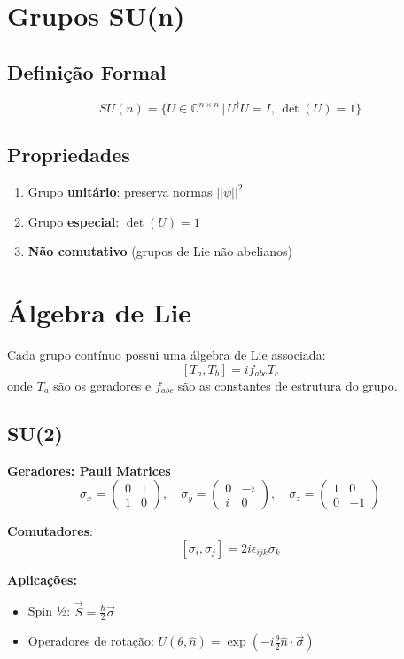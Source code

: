 \documentclass[12pt,a4paper]{article}
\begin{document}
\section{Grupos SU(n)}

\subsection{Definição Formal}
\[
SU(n) = \{ U \in \mathbb{C}^{n\times n} \,|\, U^\dagger U = I, \, \det(U) = 1 \}
\]

\subsection{Propriedades}
\begin{enumerate}
    \item Grupo \textbf{unitário}: preserva normas $||\psi||^2$  
    \item Grupo \textbf{especial}: $\det(U) = 1$  
    \item \textbf{Não comutativo} (grupos de Lie não abelianos)
\end{enumerate}

\section{Álgebra de Lie}
Cada grupo contínuo possui uma álgebra de Lie associada:
\[
[T_a, T_b] = i f_{abc} T_c
\]
onde $T_a$ são os geradores e $f_{abc}$ são as constantes de estrutura do grupo.

\subsection{SU(2)}
\textbf{Geradores: Pauli Matrices}
\[
\sigma_x = \begin{pmatrix}0 & 1\\1 & 0\end{pmatrix}, \quad
\sigma_y = \begin{pmatrix}0 & -i\\i & 0\end{pmatrix}, \quad
\sigma_z = \begin{pmatrix}1 & 0\\0 & -1\end{pmatrix}
\]

\textbf{Comutadores}:
\[
[\sigma_i, \sigma_j] = 2 i \epsilon_{ijk} \sigma_k
\]

\textbf{Aplicações:}
\begin{itemize}
    \item Spin ½: $\vec{S} = \frac{\hbar}{2} \vec{\sigma}$  
    \item Operadores de rotação: $U(\theta, \hat{n}) = \exp\left(-i \frac{\theta}{2} \hat{n} \cdot \vec{\sigma}\right)$
\end{itemize}
\end{document}
